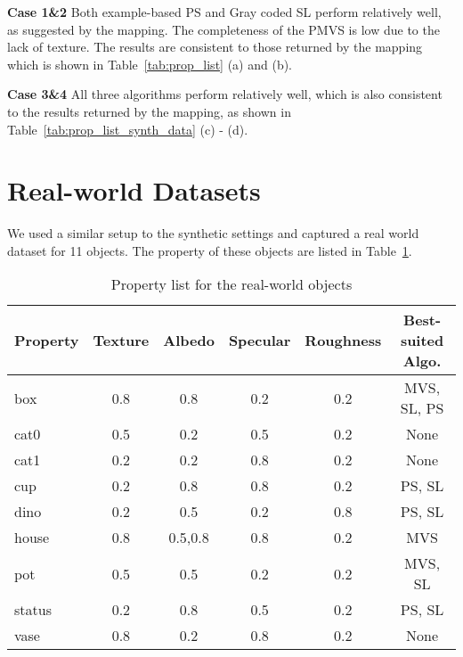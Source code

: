 \textbf{Case 1\&2} Both example-based PS and Gray coded SL perform relatively well, as suggested by the mapping. The completeness of the PMVS is low due to the lack of texture. The results are consistent to those returned by the mapping which is shown in Table~\ref{tab:prop_list} (a) and (b).

\textbf{Case 3\&4} All three algorithms perform relatively well, which is also consistent to the results returned by the mapping, as shown in Table~\ref{tab:prop_list_synth_data} (c) - (d).

\section{Real-world Datasets}
We used a similar setup to the synthetic settings and captured a real world dataset for 11 objects. The property of these objects are listed in Table~\ref{tab:prop_list_real_data}.
\begin{table}[h]
  \centering
  \begin{tabular}{l*{5}{c}}
  \hline
  \textbf{Property} & Texture & Albedo & Specular & Roughness & Best-suited Algo.\\
  \hline
  box & 0.8 & 0.8 & 0.2 & 0.2 & MVS, SL, PS\\
  cat0 & 0.5 & 0.2 & 0.5 & 0.2 & None\\
  cat1 & 0.2 & 0.2 & 0.8 & 0.2 & None\\
  cup & 0.2 & 0.8 & 0.8 & 0.2 & PS, SL\\
  dino & 0.2 & 0.5 & 0.2 & 0.8 & PS, SL\\
  house & 0.8 & 0.5,0.8 & 0.8 & 0.2 & MVS\\
  pot & 0.5 & 0.5 & 0.2 & 0.2 & MVS, SL\\
  status & 0.2 & 0.8 & 0.5 & 0.2 & PS, SL\\
  vase & 0.8 & 0.2 & 0.8 & 0.2 & None\\
  \hline
  \end{tabular}
  \caption{Property list for the real-world objects}
  \label{tab:prop_list_real_data}
\end{table}

